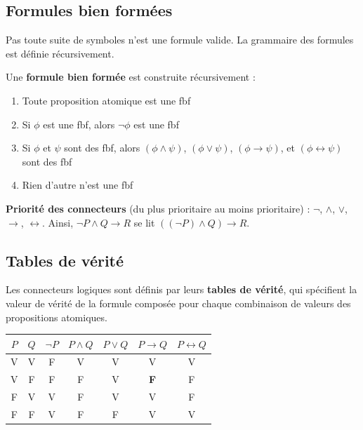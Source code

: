\documentclass[11pt,a4paper]{article}
\begin{document}
\subsection{Formules bien formées}

Pas toute suite de symboles n'est une formule valide. La grammaire des formules est définie récursivement.

\begin{definitionbox}
Une \textbf{formule bien formée} est construite récursivement :
\begin{enumerate}
    \item Toute proposition atomique est une fbf
    \item Si $\phi$ est une fbf, alors $\neg\phi$ est une fbf
    \item Si $\phi$ et $\psi$ sont des fbf, alors $(\phi \land \psi)$, $(\phi \lor \psi)$, $(\phi \rightarrow \psi)$, et $(\phi \leftrightarrow \psi)$ sont des fbf
    \item Rien d'autre n'est une fbf
\end{enumerate}
\end{definitionbox}

\textbf{Priorité des connecteurs} (du plus prioritaire au moins prioritaire) : $\neg$, $\land$, $\lor$, $\rightarrow$, $\leftrightarrow$. Ainsi, $\neg P \land Q \rightarrow R$ se lit $((\neg P) \land Q) \rightarrow R$.

\subsection{Tables de vérité}

Les connecteurs logiques sont définis par leurs \textbf{tables de vérité}, qui spécifient la valeur de vérité de la formule composée pour chaque combinaison de valeurs des propositions atomiques.

\begin{center}
\begin{tabular}{cc|ccccc}
\toprule
$P$ & $Q$ & $\neg P$ & $P \land Q$ & $P \lor Q$ & $P \rightarrow Q$ & $P \leftrightarrow Q$ \\
\midrule
V & V & F & V & V & V & V \\
V & F & F & F & V & \textbf{F} & F \\
F & V & V & F & V & V & F \\
F & F & V & F & F & V & V \\
\bottomrule
\end{tabular}
\end{center}
\end{document}
